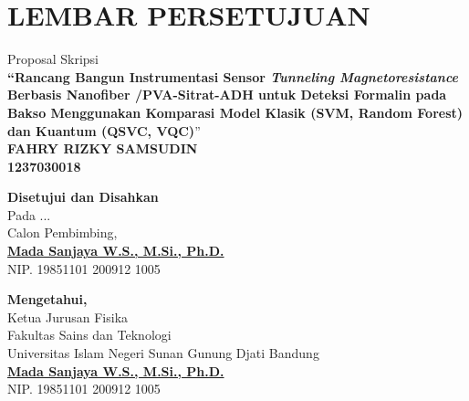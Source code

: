 \chapter*{\centering LEMBAR PERSETUJUAN}

\thispagestyle{plain}

\begin{center}
Proposal Skripsi\\
\textbf{“Rancang Bangun Instrumentasi Sensor \textit{Tunneling Magnetoresistance} Berbasis Nanofiber /PVA-Sitrat-ADH untuk Deteksi Formalin pada Bakso Menggunakan Komparasi Model Klasik (SVM, Random Forest) dan Kuantum (QSVC, VQC)}”\\

\vspace{0.35cm}
\textbf{FAHRY RIZKY SAMSUDIN\\
1237030018}

\vspace{0.35cm}
\textbf{Disetujui dan Disahkan} \\
Pada ... \the\year{} \\
Calon Pembimbing, \\
\vspace{1.5cm}
\underline{ \textbf{Mada Sanjaya W.S., M.Si., Ph.D.} } \\
NIP. 19851101 200912 1005 \\

\vspace{0.4cm}

\textbf{Mengetahui,} \\
Ketua Jurusan Fisika \\
Fakultas Sains dan Teknologi \\
Universitas Islam Negeri Sunan Gunung Djati Bandung \\
\vspace{1.5cm}
\underline{ \textbf{Mada Sanjaya W.S., M.Si., Ph.D.} } \\
NIP. 19851101 200912 1005 \\
\end{center}
\newpage